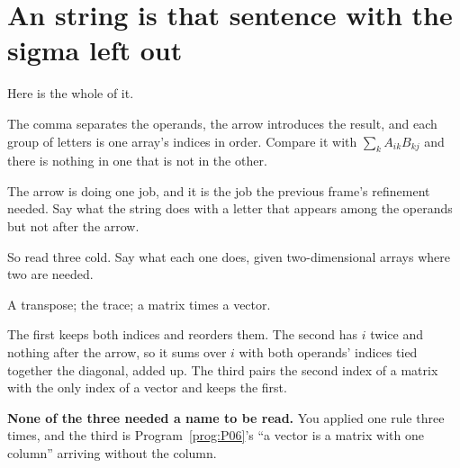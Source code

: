 \section{An \texorpdfstring{}{einsum} string is that sentence with the sigma left out}
\label{sec:P07-einsum}

\begin{fr}
Here is the whole of it.

\begin{center}
\end{center}

The comma separates the operands, the arrow introduces the result, and each
group of letters is one array's indices in order. Compare it with
$\sum_k A_{ik} B_{kj}$ and there is nothing in one that is not in the other.

The arrow is doing one job, and it is the job the previous frame's refinement
needed. Say what the string does with a letter that appears among the operands
but not after the arrow.
\dotline
\nextframe
\end{fr}

\begin{fr}
So read three cold. Say what each one does, given two-dimensional arrays where
two are needed.

\begin{center}
 \qquad {} \qquad {}
\end{center}
\dotline
\nextframe
\end{fr}

\begin{fr}
\begin{ansblock}
A transpose; the trace; a matrix times a vector.
\end{ansblock}

The first keeps both indices and reorders them. The second has $i$ twice and
nothing after the arrow, so it sums over $i$ with both operands' indices tied
together \dash{} the diagonal, added up. The third pairs the second index of a
matrix with the only index of a vector and keeps the first.

\textbf{None of the three needed a name to be read.} You applied one rule three
times, and the third is Program~\ref{prog:P06}'s \enquote{a vector is a matrix
with one column} arriving without the column.
\end{fr}

